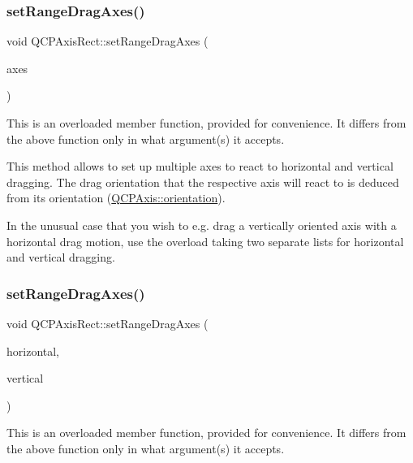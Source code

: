 \subsubsection{\texorpdfstring{set\+Range\+Drag\+Axes()}{setRangeDragAxes()}\hspace{0.1cm}{\footnotesize\ttfamily [2/3]}}
{\footnotesize\ttfamily void Q\+C\+P\+Axis\+Rect\+::set\+Range\+Drag\+Axes (\begin{DoxyParamCaption}\item[{Q\+List$<$ \hyperlink{classQCPAxis}{Q\+C\+P\+Axis} $\ast$$>$}]{axes }\end{DoxyParamCaption})}

This is an overloaded member function, provided for convenience. It differs from the above function only in what argument(s) it accepts.

This method allows to set up multiple axes to react to horizontal and vertical dragging. The drag orientation that the respective axis will react to is deduced from its orientation (\hyperlink{classQCPAxis_ab988ef4538e2655bb77bd138189cd42e}{Q\+C\+P\+Axis\+::orientation}).

In the unusual case that you wish to e.\+g. drag a vertically oriented axis with a horizontal drag motion, use the overload taking two separate lists for horizontal and vertical dragging. \mbox{\label{classQCPAxisRect_ab767e659f952fd7cbf61faaf33feefc5}} 
\subsubsection{\texorpdfstring{set\+Range\+Drag\+Axes()}{setRangeDragAxes()}\hspace{0.1cm}{\footnotesize\ttfamily [3/3]}}
{\footnotesize\ttfamily void Q\+C\+P\+Axis\+Rect\+::set\+Range\+Drag\+Axes (\begin{DoxyParamCaption}\item[{Q\+List$<$ \hyperlink{classQCPAxis}{Q\+C\+P\+Axis} $\ast$$>$}]{horizontal,  }\item[{Q\+List$<$ \hyperlink{classQCPAxis}{Q\+C\+P\+Axis} $\ast$$>$}]{vertical }\end{DoxyParamCaption})}

This is an overloaded member function, provided for convenience. It differs from the above function only in what argument(s) it accepts.

